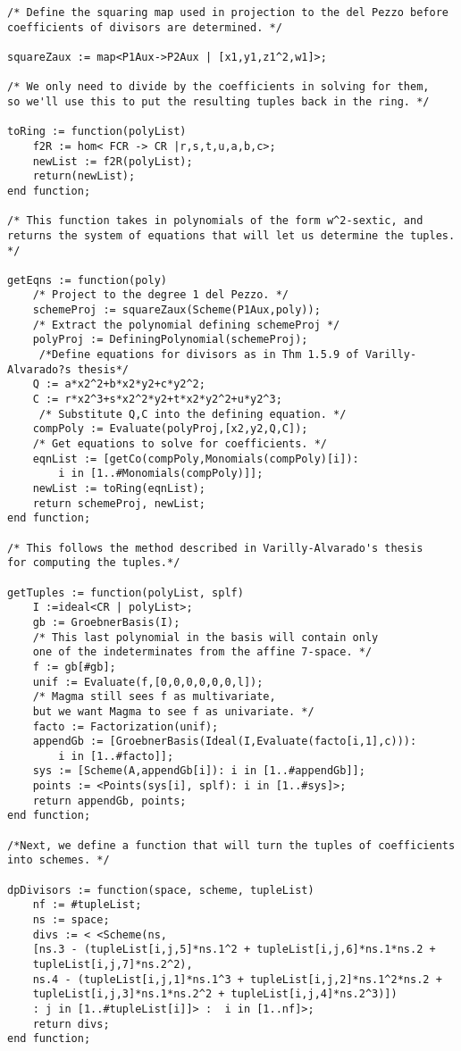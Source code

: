 \documentclass[12pt,twoside]{reedthesis}
\theoremstyle{plain}
\theoremstyle{definition}
\theoremstyle{remark}
\begin{document}
\begin{appendices}
\begin{verbatim}
/* Define the squaring map used in projection to the del Pezzo before 
coefficients of divisors are determined. */

squareZaux := map<P1Aux->P2Aux | [x1,y1,z1^2,w1]>;

/* We only need to divide by the coefficients in solving for them, 
so we'll use this to put the resulting tuples back in the ring. */

toRing := function(polyList)
	f2R := hom< FCR -> CR |r,s,t,u,a,b,c>;
	newList := f2R(polyList);
	return(newList);
end function;

/* This function takes in polynomials of the form w^2-sextic, and
returns the system of equations that will let us determine the tuples. */

getEqns := function(poly)
	/* Project to the degree 1 del Pezzo. */
	schemeProj := squareZaux(Scheme(P1Aux,poly)); 
	/* Extract the polynomial defining schemeProj */
	polyProj := DefiningPolynomial(schemeProj);
	 /*Define equations for divisors as in Thm 1.5.9 of Varilly-Alvarado?s thesis*/
	Q := a*x2^2+b*x2*y2+c*y2^2; 
	C := r*x2^3+s*x2^2*y2+t*x2*y2^2+u*y2^3;
	 /* Substitute Q,C into the defining equation. */
	compPoly := Evaluate(polyProj,[x2,y2,Q,C]);
	/* Get equations to solve for coefficients. */	
	eqnList := [getCo(compPoly,Monomials(compPoly)[i]): 
		i in [1..#Monomials(compPoly)]]; 
	newList := toRing(eqnList);
	return schemeProj, newList;
end function;

/* This follows the method described in Varilly-Alvarado's thesis 
for computing the tuples.*/

getTuples := function(polyList, splf)
	I :=ideal<CR | polyList>; 
	gb := GroebnerBasis(I);
	/* This last polynomial in the basis will contain only 
	one of the indeterminates from the affine 7-space. */
	f := gb[#gb]; 
	unif := Evaluate(f,[0,0,0,0,0,0,l]); 
	/* Magma still sees f as multivariate, 
	but we want Magma to see f as univariate. */
	facto := Factorization(unif);
	appendGb := [GroebnerBasis(Ideal(I,Evaluate(facto[i,1],c))): 
		i in [1..#facto]];
	sys := [Scheme(A,appendGb[i]): i in [1..#appendGb]];
	points := <Points(sys[i], splf): i in [1..#sys]>;
	return appendGb, points; 
end function;

/*Next, we define a function that will turn the tuples of coefficients
into schemes. */

dpDivisors := function(space, scheme, tupleList)
	nf := #tupleList;
	ns := space;
	divs := < <Scheme(ns,
	[ns.3 - (tupleList[i,j,5]*ns.1^2 + tupleList[i,j,6]*ns.1*ns.2 + 
	tupleList[i,j,7]*ns.2^2), 
	ns.4 - (tupleList[i,j,1]*ns.1^3 + tupleList[i,j,2]*ns.1^2*ns.2 + 
	tupleList[i,j,3]*ns.1*ns.2^2 + tupleList[i,j,4]*ns.2^3)])
	: j in [1..#tupleList[i]]> :  i in [1..nf]>;
	return divs;
end function;


\end{verbatim}
\end{appendices}
\end{document}
